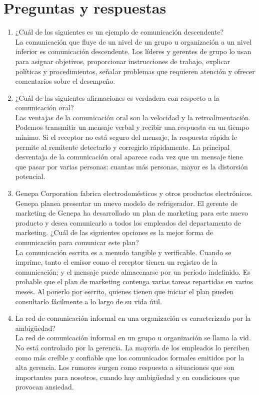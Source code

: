 \documentclass[10pt]{book}
\begin{document}
\section{Preguntas y respuestas}
\begin{enumerate}[\bfseries 1.]
\item ¿Cuál de los siguientes es un ejemplo de comunicación descendente?\\
La comunicación que fluye de un nivel de un grupo u organización a un nivel inferior es comunicación descendente. Los líderes y gerentes de grupo lo usan para asignar objetivos, proporcionar instrucciones de trabajo, explicar políticas y procedimientos, señalar problemas que requieren atención y ofrecer comentarios sobre el desempeño.
\item ¿Cuál de las siguientes afirmaciones es verdadera con respecto a la comunicación oral?\\
Las ventajas de la comunicación oral son la velocidad y la retroalimentación. Podemos transmitir un mensaje verbal y recibir una respuesta en un tiempo mínimo. Si el receptor no está seguro del mensaje, la respuesta rápida le permite al remitente detectarlo y corregirlo rápidamente. La principal desventaja de la comunicación oral aparece cada vez que un mensaje tiene que pasar por varias personas: cuantas más personas, mayor es la distorsión potencial.
\item Genepa Corporation fabrica electrodomésticos y otros productos electrónicos. Genepa planea presentar un nuevo modelo de refrigerador. El gerente de marketing de Genepa ha desarrollado un plan de marketing para este nuevo producto y desea comunicarlo a todos los empleados del departamento de marketing. ¿Cuál de las siguientes opciones es la mejor forma de comunicación para comunicar este plan?\\
La comunicación escrita es a menudo tangible y verificable. Cuando se imprime, tanto el emisor como el receptor tienen un registro de la comunicación; y el mensaje puede almacenarse por un período indefinido. Es probable que el plan de marketing contenga varias tareas repartidas en varios meses. Al ponerlo por escrito, quienes tienen que iniciar el plan pueden consultarlo fácilmente a lo largo de su vida útil.
\item La red de comunicación informal en una organización es caracterizado por la ambigüedad?\\
La red de comunicación informal en un grupo u organización se llama la vid. No está controlado por la gerencia. La mayoría de los empleados lo perciben como más creíble y confiable que los comunicados formales emitidos por la alta gerencia. Los rumores surgen como respuesta a situaciones que son importantes para nosotros, cuando hay ambigüedad y en condiciones que provocan ansiedad.

\end{enumerate}
\end{document}
